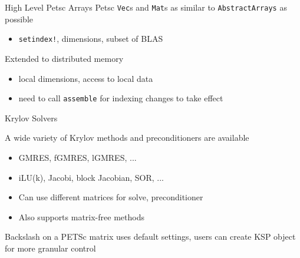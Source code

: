 \documentclass{beamer}
\begin{document}
\begin{comment}
\begin{frame}[fragile]{The Rewriter}
For each Petsc object, introduce a Julia immutable type
\begin{itemize}
  \item Parameterize on datatype \texttt{T} to enable dispatch
\end{itemize}
\begin{verbatim}
  typealias Mat Ptr{_p_Mat} -> immutable Mat{T}
\end{verbatim}
\hfill

Also map C equivalent types to more general types:
\begin{verbatim} 
  Ptr{Float64} -> Union{DenseArray{Float64},
                        Ptr{Float64}, Ref{Float64}}
\end{verbatim}
\hfill

Implemented with a recursive descent search and replace on the \texttt{Expr}s 
generated by Clang.jl

\end{frame}
\end{comment}

\begin{frame}[fragile]{High Level Petsc Arrays}
Petsc \texttt{Vec}s and \texttt{Mat}s as similar to \texttt{AbstractArrays} as possible
\begin{itemize}
  \item \texttt{setindex!}, dimensions, subset of BLAS
\end{itemize}
\hfill


Extended to distributed memory
\begin{itemize}
  \item local dimensions, access to local data
  \item need to call \texttt{assemble} for indexing changes to take effect
\end{itemize}

\end{frame}

\begin{frame}{Krylov Solvers}
\hfill

A wide variety of Krylov methods and preconditioners are available
\begin{itemize}
  \item GMRES, fGMRES, lGMRES, ...
  \item iLU(k), Jacobi, block Jacobian, SOR, ...
  \item Can use different matrices for solve, preconditioner
  \item Also supports matrix-free methods
\end{itemize}
\hfill

Backslash on a PETSc matrix uses default settings, users can create KSP object for more granular control
\end{frame}
\end{document}
